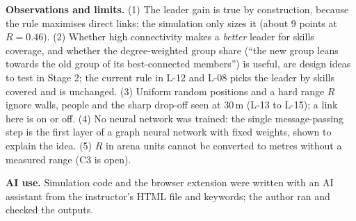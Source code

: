\IfFileExists{IEEEtran.cls}{\documentclass[conference]{IEEEtran}}{\documentclass[10pt,twocolumn]{article}}
\begin{document}
\textbf{Observations and limits.} (1) The leader gain is true by construction, because the rule maximises direct links; the simulation only sizes it (about 9 points at $R=0.46$). (2) Whether high connectivity makes a \emph{better} leader for skills coverage, and whether the degree-weighted group share (``the new group leans towards the old group of its best-connected members'') is useful, are design ideas to test in Stage 2; the current rule in L-12 and L-08 picks the leader by skills covered and is unchanged. (3) Uniform random positions and a hard range $R$ ignore walls, people and the sharp drop-off seen at 30\,m (L-13 to L-15); a link here is on or off. (4) No neural network was trained: the single message-passing step is the first layer of a graph neural network with fixed weights, shown to explain the idea. (5) $R$ in arena units cannot be converted to metres without a measured range (C3 is open).

\textbf{AI use.} Simulation code and the browser extension were written with an AI assistant from the instructor's HTML file and keywords; the author ran and checked the outputs.
\end{document}
